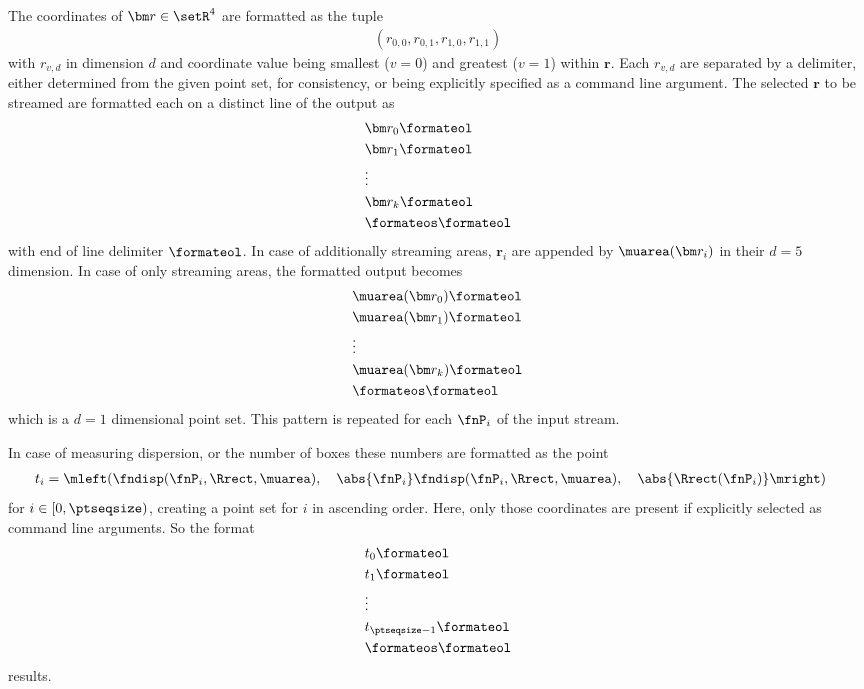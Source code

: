 The coordinates of $\bm r \in \setR^4$ are formatted as the tuple
\begin{align*}
  (r_{0,0}, r_{0,1}, r_{1,0}, r_{1,1})
\end{align*}
with $r_{v,d}$ in dimension $d$ and coordinate value being smallest ($v=0$) and greatest ($v=1$) within $\bm r$. Each $r_{v,d}$ are separated by a delimiter, either determined from the given point set, for consistency, or being explicitly specified as a command line argument.
\clearpage
The selected $\bm r$ to be streamed are formatted each on a distinct line of the output as
\begin{align*}
  &\bm r_0\formateol \\
  &\bm r_1\formateol \\
  &\vdots \\
  &\bm r_k\formateol \\
  &\formateos\formateol
\end{align*}
with end of line delimiter $\formateol$. In case of additionally streaming areas, $\bm r_i$ are appended by $\muarea(\bm r_i)$ in their $d=5$ dimension. In case of only streaming areas, the formatted output becomes
\begin{align*}
  &\muarea(\bm r_0)\formateol \\
  &\muarea(\bm r_1)\formateol \\
  &\vdots \\
  &\muarea(\bm r_k)\formateol \\
  &\formateos\formateol
\end{align*}
which is a $d=1$ dimensional point set. This pattern is repeated for each $\fnP_i$ of the input stream.

In case of measuring dispersion, or the number of boxes these numbers are formatted as the point
\begin{align*}
  t_i &= \mleft( \fndisp(\fnP_i, \Rrect, \muarea),\quad \abs{\fnP_i} \fndisp(\fnP_i, \Rrect, \muarea),\quad \abs{\Rrect(\fnP_i)} \mright)
\end{align*}
for $i \in [0,\ptseqsize)$, creating a point set for $i$ in ascending order. Here, only those coordinates are present if explicitly selected as command line arguments. So the format
\begin{align*}
  &t_0\formateol\\
  &t_1\formateol\\
  &\vdots \\
  &t_{\ptseqsize-1}\formateol\\
  &\formateos\formateol
\end{align*}
results.


